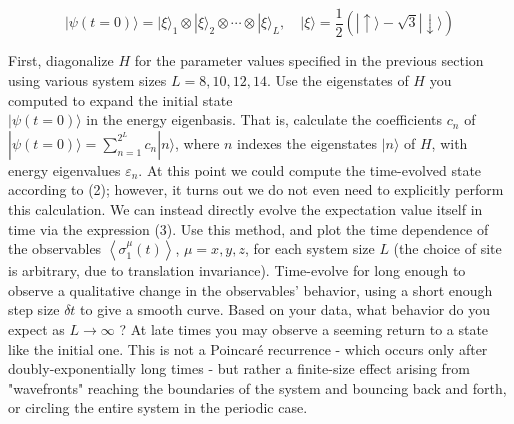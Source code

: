\documentclass[12pt]{article}
\begin{document}
\begin{equation*}
|\psi(t=0)\rangle=|\xi\rangle_{1} \otimes|\xi\rangle_{2} \otimes \cdots \otimes|\xi\rangle_{L}, \quad|\xi\rangle=\frac{1}{2}(|\uparrow\rangle-\sqrt{3}|\downarrow\rangle) \tag{9}
\end{equation*}


First, diagonalize $H$ for the parameter values specified in the previous section using various system sizes $L=8,10,12,14$. Use the eigenstates of $H$ you computed to expand the initial state\\
$|\psi(t=0)\rangle$ in the energy eigenbasis. That is, calculate the coefficients $c_{n}$ of $|\psi(t=0)\rangle=\sum_{n=1}^{2^{L}} c_{n}|n\rangle$, where $n$ indexes the eigenstates $|n\rangle$ of $H$, with energy eigenvalues $\varepsilon_{n}$. At this point we could compute the time-evolved state according to (2); however, it turns out we do not even need to explicitly perform this calculation. We can instead directly evolve the expectation value itself in time via the expression (3). Use this method, and plot the time dependence of the observables $\left\langle\sigma_{1}^{\mu}(t)\right\rangle$, $\mu=x, y, z$, for each system size $L$ (the choice of site is arbitrary, due to translation invariance). Time-evolve for long enough to observe a qualitative change in the observables' behavior, using a short enough step size $\delta t$ to give a smooth curve. Based on your data, what behavior do you expect as $L \rightarrow \infty$ ? At late times you may observe a seeming return to a state like the initial one. This is not a Poincaré recurrence - which occurs only after doubly-exponentially long times - but rather a finite-size effect arising from "wavefronts" reaching the boundaries of the system and bouncing back and forth, or circling the entire system in the periodic case.
\newpage
\end{document}
